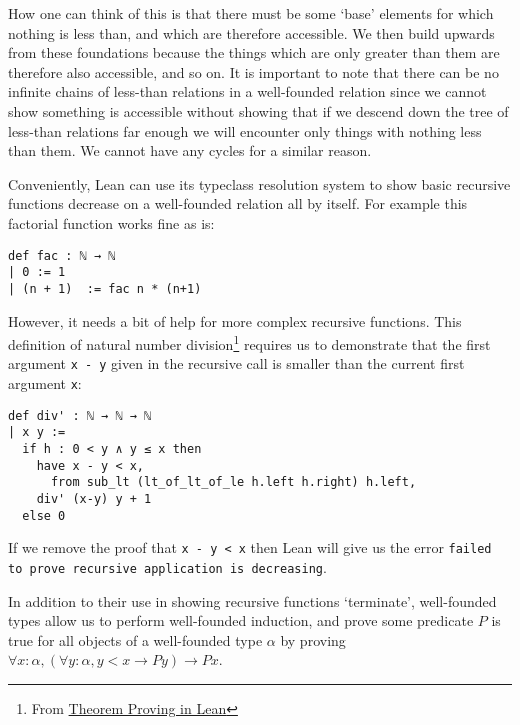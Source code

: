 \documentclass{article}
\renewcommand{\a}{\alpha}
\newcommand{\ct}{\texttt}
\begin{document}
How one can think of this is that there must be some `base' elements for which nothing is less than, and which are therefore accessible.
We then build upwards from these foundations because the things which are only greater than them are therefore also accessible, and so on.
It is important to note that there can be no infinite chains of less-than relations in a well-founded relation since we cannot show something is accessible without showing that if we descend down the tree of less-than relations far enough we will encounter only things with nothing less than them. %
We cannot have any cycles for a similar reason.

Conveniently, Lean can use its typeclass resolution system to show basic recursive functions decrease on a well-founded relation all by itself. For example this factorial function works fine as is:
\begin{lstlisting}
def fac : ℕ → ℕ
| 0 := 1
| (n + 1)  := fac n * (n+1)
\end{lstlisting}
However, it needs a bit of help for more complex recursive functions.
This definition of natural number division\footnote{From \href{https://leanprover.github.io/theorem\_proving\_in\_lean/induction\_and\_recursion.html\#well-founded-recursion-and-induction}{Theorem Proving in Lean}} requires us to demonstrate that the first argument \ct{x - y} given in the recursive call is smaller than the current first argument \ct{x}:
\begin{lstlisting}
def div' : ℕ → ℕ → ℕ
| x y :=
  if h : 0 < y ∧ y ≤ x then
    have x - y < x,
      from sub_lt (lt_of_lt_of_le h.left h.right) h.left,
    div' (x-y) y + 1
  else 0
\end{lstlisting}
If we remove the proof that \ct{x - y < x} then Lean will give us the error \ct{failed to prove recursive application is decreasing}.

In addition to their use in showing recursive functions `terminate', well-founded types allow us to perform well-founded induction, and prove some predicate $P$ is true for all objects of a well-founded type $\a$ by proving $\forall x : \a, (\forall y:\a, y < x \to P y) \to P x$.
\end{document}
